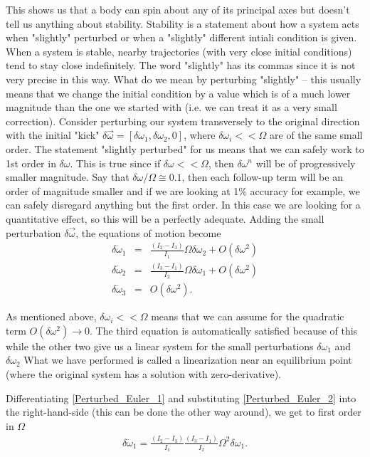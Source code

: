 \documentclass[a4paper]{article}
\begin{document}
	This shows us that a body can spin about any of its principal axes but doesn't tell us anything about stability.
	Stability is a statement about how a system acts when "slightly" perturbed or when a "slightly" different intiali condition is given.
	When a system is stable, nearby trajectories (with very close initial conditions) tend to stay close indefinitely.
	The word "slightly" has its commas since it is not very precise in this way.
	What do we mean by perturbing "slightly" -- this usually means that we change the initial condition by a value which is of a much lower magnitude than the one we started with (i.e. we can treat it as a very small correction).
	Consider perturbing our system transversely to the original direction with the initial "kick" $\delta \vec{\omega} = [ \delta\omega_1 , \delta\omega_2 , 0 ]$, where $\delta\omega_i << \Omega$ are of the same small order.
	The statement "slightly perturbed" for us means that we can safely work to 1st order in $\delta\omega$.
	This is true since if $\delta\omega << \Omega$, then $\delta\omega^n$ will be of progressively smaller magnitude.
	Say that $\delta\omega / \Omega \cong 0.1$, then each follow-up term will be an order of magnitude smaller and if we are looking at 1\% accuracy for example, we can safely disregard anything but the first order.
	In this case we are looking for a quantitative effect, so this will be a perfectly adequate.
	Adding the small perturbation $\delta\vec{\omega}$, the equations of motion become
	\begin{eqnarray}\label{Perturbed_Euler_1}
		\delta\dot{\omega}_1 & = & \frac{( I_2 - I_3 )}{I_1}\Omega \delta\omega_2 + O( \delta\omega^2 ) \\ \label{Perturbed_Euler_2}
		\delta\dot{\omega}_2 & = & \frac{( I_3 - I_1 )}{I_2}\Omega \delta\omega_1 + O( \delta\omega^2 ) \\ \label{Perturbed_Euler_3}
		\delta\dot{\omega}_3 & = & O( \delta\omega^2 ).
	\end{eqnarray}

	As mentioned above, $\delta\omega_i << \Omega$ means that we can assume for the quadratic term $O(\delta\omega^2) \rightarrow 0 $.
	The third equation is automatically satisfied because of this while the other two give us a linear system for the small perturbations $\delta \omega_1$ and $\delta \omega_2$
	What we have performed is called a linearization near an equilibrium point (where the original system has a solution with zero-derivative).

	Differentiating \eqref{Perturbed_Euler_1} and substituting \eqref{Perturbed_Euler_2} into the right-hand-side (this can be done the other way around), we get to first order in $\Omega$
	\begin{eqnarray}\label{Perturbed_oscillator}
		\delta\ddot{\omega}_1 = \frac{( I_2 - I_3 )}{I_1}\frac{( I_3 - I_1 )}{I_2}\Omega^2 \delta\omega_1.
	\end{eqnarray}
\end{document}
